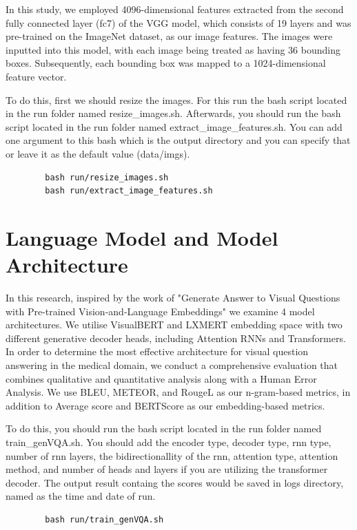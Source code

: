 \documentclass{adonis}
\begin{document}
        In this study, we employed 4096-dimensional features extracted from the second fully connected layer (fc7) of the VGG model, which consists of 19 layers and was pre-trained on the ImageNet dataset, as our image features. The images were inputted into this model, with each image being treated as having 36 bounding boxes. Subsequently, each bounding box was mapped to a 1024-dimensional feature vector.
	
        To do this, first we should resize the images. For this run the bash script located in the run folder named resize\_images.sh. Afterwards, you should run the bash script located in the run folder named extract\_image\_features.sh. You can add one argument to this bash which is the output directory and you can specify that or leave it as the default value (data/imgs).
        \begin{verbatim}
        bash run/resize_images.sh
        bash run/extract_image_features.sh
        \end{verbatim}

    



 \section{Language Model and Model Architecture}
 In this research, inspired by the work of "Generate Answer to Visual Questions with Pre-trained Vision-and-Language Embeddings" \cite{genvqa} we examine 4 model architectures. We utilise VisualBERT and LXMERT embedding space with two different generative decoder heads, including Attention RNNs and Transformers. In order to determine the most effective architecture for visual question answering in the medical domain, we conduct a comprehensive evaluation that combines qualitative and quantitative analysis along with a Human Error Analysis.  We use BLEU, METEOR, and RougeL as our n-gram-based metrics, in addition to Average score and BERTScore as our embedding-based metrics.

 
To do this, you should run the bash script located in the run folder named train\_genVQA.sh. You should add the encoder type, decoder type, rnn type, number of rnn layers, the bidirectionallity of the rnn, attention type, attention method, and number of heads and layers if you are utilizing the transformer decoder. The output result containg the scores would be saved in logs directory, named as the time and date of run.


\begin{verbatim}
        bash run/train_genVQA.sh
\end{verbatim}
\end{document}

